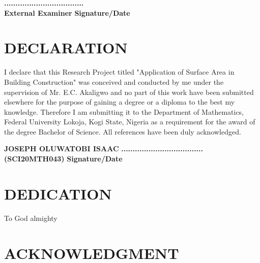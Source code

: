 \documentclass[12pt,a4paper,openany,titlepage,reqno, final]{report}
\theoremstyle{definition}
\begin{document}
	\noindent \textbf{} \hspace{9.5cm}
	\textbf{...................................}\\
	\textbf{External Examiner} \hspace{7cm} \textbf{Signature/Date }
	\vspace{2cm}
	
	\chapter*{DECLARATION}
	
	I declare that this Research Project titled "Application of Surface Area in Building Construction" was conceived and conducted by me under the supervision of Mr. E.C. Akaligwo and no part of this work have been submitted elsewhere for the purpose of gaining a degree or a diploma to the best my knowledge. Therefore I am submitting it to the Department of Mathematics, Federal University Lokoja, Kogi State, Nigeria as a requirement for the award of the degree Bachelor of Science.  All references have been duly acknowledged.
	
	\noindent \textbf{JOSEPH OLUWATOBI ISAAC}  \hspace{4.0cm} \textbf{....................................}\\
	\textbf{(SCI20MTH043)} \hspace{7cm} \textbf{Signature/Date }
	\chapter*{DEDICATION}
	\begin{center}
		To God almighty
	\end{center} 

	\chapter*{ACKNOWLEDGMENT}
	
\end{document}
